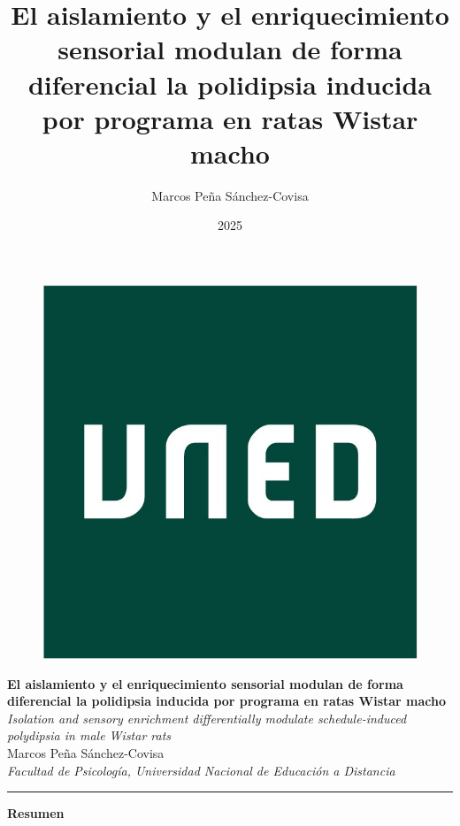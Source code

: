 \documentclass[12pt,a4paper]{article}
\title{El aislamiento y el enriquecimiento sensorial modulan de forma diferencial la polidipsia inducida por programa en ratas Wistar macho}
\author{Marcos Peña Sánchez-Covisa}
\date{2025}
\begin{document}
\begin{figure}[H]
    \raggedleft
    \includegraphics[scale=0.05]{LogoUNED.jpg}
\end{figure}

\begin{center}
    {\Large \textbf{El aislamiento y el enriquecimiento sensorial modulan de forma diferencial la polidipsia inducida por programa en ratas Wistar macho}} \\
    \vspace{1mm}
    {\normalsize \textit{Isolation and sensory enrichment differentially modulate schedule-induced polydipsia in male Wistar rats}} \\
    \vspace{5mm}
    {\large Marcos Peña Sánchez-Covisa} \\
    \vspace{3mm}
    \textit{Facultad de Psicología, Universidad Nacional de Educación a Distancia}
\end{center}

\begin{center}
    \textcolor{azul}{\rule{150mm}{0.5mm}}
    \end{center}
    
    \vspace{3mm}
    
    \begin{center}
    \textbf{\large Resumen}
    \end{center}
    
\end{document}
